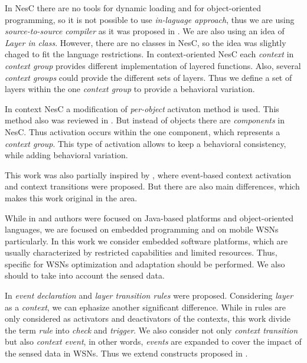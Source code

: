\documentclass{ubicomp-ext}
\begin{document}
In NesC there are no tools for dynamic loading and for object-oriented programming, so it is not possible to use \textit{in-laguage approach}, thus we are using \textit{source-to-source compiler} as it was proposed in \cite{salvaneschi12}. We are also using an idea of \textit{Layer in class}\cite{salvaneschi12}. However, there are no classes in NesC, so the idea was slightly chaged to fit the language restrictions. In context-oriented NesC each \textit{context} in \textit{context group} provides different implementation of layered functions. Also, several \textit{context groups} could provide the different sets of layers. Thus we define a set of layers within the one \textit{context group} to provide a behavioral variation.

In context NesC a modification of \textit{per-object} activaton method is used. This method also was reviewed in \cite{salvaneschi12}. But instead of objects there are \textit{components} in NesC. Thus activation occurs within the one component, which represents a \textit{context group}. This type of activation allows to keep a behavioral consistency, while adding behavioral variation.

This work was also partially inspired by \cite{kamina11}, where event-based context activation and context transitions were proposed. But there are also main differences, which makes this work original in the area.

While in \cite{kamina11} and \cite{kamina10} authors were focused on Java-based platforms and object-oriented languages, we are focused on embedded programming and on mobile WSNs particularly. In this work we consider embedded software platforms, which are usually characterized by restricted capabilities and limited resources. Thus, specific for WSNs optimization and adaptation should be performed. We also should to take into account the sensed data.

In \cite{kamina11} \textit{event declaration} and \textit{layer transition rules} were proposed. Considering \textit{layer} as a \textit{context}, we can ephasize another significant difference. While in \cite{kamina11} rules are only considered as activators and deactivators of the contexts, this work divide the term \textit{rule} into \textit{check} and \textit{trigger}. We also consider not only \textit{context transition} but also \textit{context event}, in other words, \textit{events} are expanded to cover the impact of the sensed data in WSNs. Thus we extend constructs proposed in \cite{kamina11}.
\end{document}
